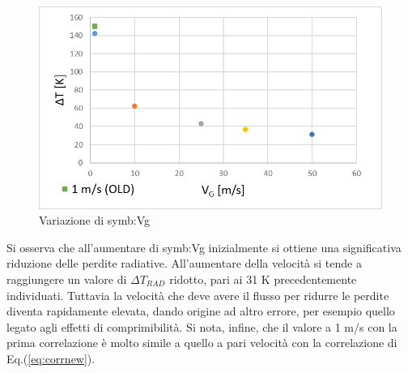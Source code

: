 \begin{figure}[H]
	\centering
	\includegraphics[width=0.7\linewidth]{"../sperimentazione nei propulsori/varV"}
	\caption{Variazione di \gls{symb:Vg}}
	\label{fig:varv}
\end{figure}

Si osserva che all'aumentare di \gls{symb:Vg} inizialmente si ottiene una significativa riduzione delle perdite radiative. All'aumentare della velocità si tende a raggiungere un valore di $\Delta T_{\textit{RAD}}$ ridotto, pari ai 31 K precedentemente individuati. Tuttavia la velocità che deve avere il flusso per ridurre le perdite diventa rapidamente elevata, dando origine ad altro errore, per esempio quello legato agli effetti di comprimibilità. Si nota, infine, che il valore a 1 m/s con la prima correlazione è molto simile a quello a pari velocità con la correlazione di Eq.(\ref{eq:corrnew}).